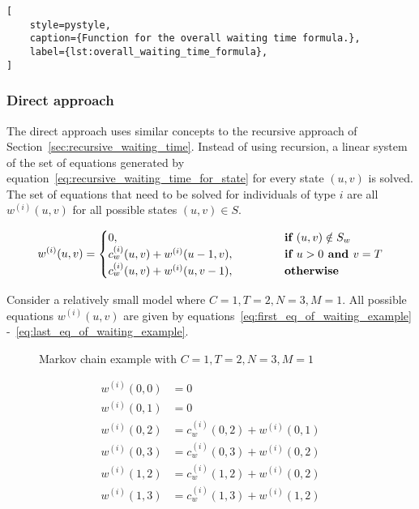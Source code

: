 \begin{lstlisting}[
    style=pystyle,
    caption={Function for the overall waiting time formula.},
    label={lst:overall_waiting_time_formula},
]
\end{lstlisting}


\subsubsection{Direct approach}\label{sec:direct_waiting_time}

The direct approach uses similar concepts to the recursive approach of
Section~\ref{sec:recursive_waiting_time}.
Instead of using recursion, a linear system of the set of equations generated by
equation~\eqref{eq:recursive_waiting_time_for_state} for every state \((u,v)\)
is solved.
The set of equations that need to be solved for individuals of type \(i\) are
all \( w^{(i)}(u, v) \) for all possible states \((u,v) \in S\).


\begin{equation*}
    w^{(i)}(u,v) =
    \begin{cases}
        0, \hspace{4.85cm} & \textbf{if } (u,v) \notin S_w \\
        c^{(i)}_w(u,v) + w^{(i)}(u-1, v), & \textbf{if } u > 0
        \textbf{ and } v = T \\
        c^{(i)}_w(u,v) + w^{(i)}(u, v-1), & \textbf{otherwise}
    \end{cases}
\end{equation*}

Consider a relatively small model where \(C=1, T=2, N=3, M=1\).
All possible equations \(w^{(i)}(u,v)\) are given by
equations~\eqref{eq:first_eq_of_waiting_example}
-~\eqref{eq:last_eq_of_waiting_example}.

\begin{minipage}{0.45\textwidth}
    \begin{figure}[H]
        \centering
        \scalebox{0.65}{}
        \caption{Markov chain example with \(C=1, T=2, N=3, M=1\)}
        \label{fig:example_algeb_waiting}
    \end{figure}
\end{minipage}
\begin{minipage}{0.5\textwidth}
    \begin{align}
        w^{(i)}(0,0) &= 0 \\
        w^{(i)}(0,1) &= 0 \\
        w^{(i)}(0,2) &= c^{(i)}_w(0,2) + w^{(i)}(0,1) \label{eq:first_eq_of_waiting_example} \\
        w^{(i)}(0,3) &= c^{(i)}_w(0,3) + w^{(i)}(0,2) \\
        w^{(i)}(1,2) &= c^{(i)}_w(1,2) + w^{(i)}(0,2) \\
        w^{(i)}(1,3) &= c^{(i)}_w(1,3) + w^{(i)}(1,2) \label{eq:last_eq_of_waiting_example}
    \end{align}
\end{minipage}

